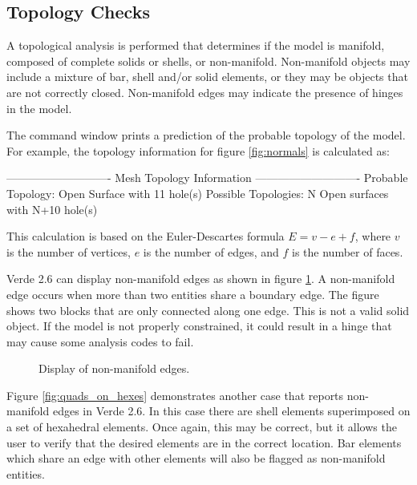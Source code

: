 \documentclass[10pt]{report}
\begin{document}
\subsection{Topology Checks} 

A topological analysis is performed that determines if the
model is manifold, composed of complete solids or shells,
or non-manifold.  Non-manifold objects may include a mixture
of bar, shell and/or solid elements, or they may be objects that are
not correctly closed.  Non-manifold edges may indicate the presence 
of  hinges in the model.

The command window prints a prediction of the probable topology of the model.
For example, the topology information for figure \ref{fig:normals} 
is calculated as:

\begin{example}
----------------------------
Mesh Topology Information
----------------------------
   Probable Topology:  Open Surface with 11 hole(s)
   Possible Topologies: N Open surfaces with N+10 hole(s)
\end{example}

This calculation is based on the Euler-Descartes formula $E= v - e + f$,
where $v$ is the number of vertices, $e$ is the number of edges, and
$f$ is the number of faces\cite{CRC}.

Verde 2.6 can display non-manifold edges as shown in figure 
\ref{fig:nonmanifold}.  
A non-manifold edge occurs when more than two entities share a 
boundary edge.
The figure shows two blocks that are only
connected along one edge.  This is not a valid solid object.  If the 
model is not properly constrained, it could result in a hinge that
may cause some analysis codes to fail.

\htmlrule
\begin{figure}[tbhp]
  \begin{center}
              {}
    \caption{Display of non-manifold edges.}
    \label{fig:nonmanifold}
  \end{center}
\end{figure}     
\htmlrule

Figure \ref{fig:quads_on_hexes} demonstrates another case that
reports non-manifold edges in Verde 2.6.  In this case there
are shell elements superimposed on a set of hexahedral elements.  
Once again, this may be correct, but it allows the user to verify 
that the desired elements are in the correct location.  Bar elements
which share an edge with other elements will also be flagged as
non-manifold entities.
\end{document}
